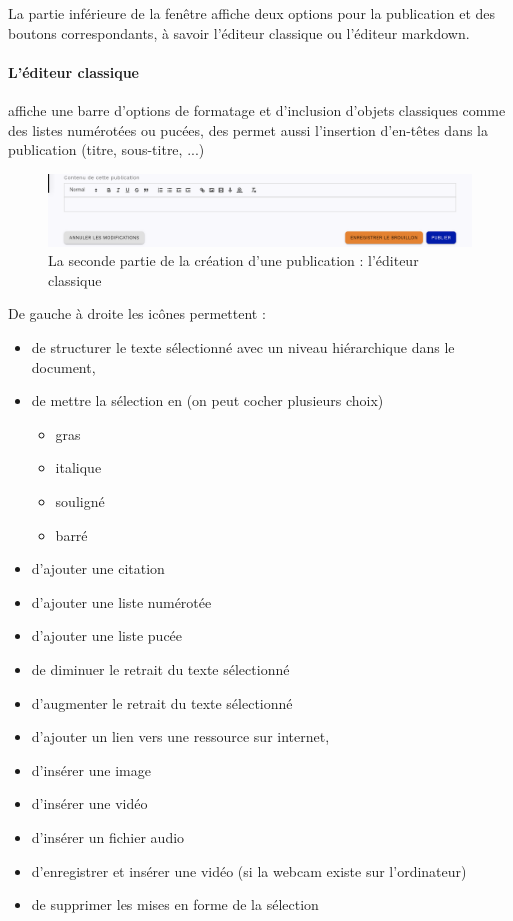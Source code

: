 La partie inférieure de la fenêtre affiche deux options pour la publication et des boutons correspondants, à savoir l'éditeur classique ou l'éditeur markdown.

\paragraph{L'éditeur classique} affiche une barre d'options de formatage et d'inclusion d'objets classiques comme des listes numérotées ou pucées, des  permet aussi l'insertion d'en-têtes dans la publication (titre, sous-titre,  ...)
\begin{figure}
	\centering
	\includegraphics{./Captures/portail.publications.creer.publication.2.classique.png}
	\caption{La seconde partie de la création d'une publication : l'éditeur classique}
\end{figure}
De gauche à droite les icônes permettent :
\begin{itemize}
	\item de structurer le texte sélectionné avec un niveau hiérarchique dans le document,
	\item de mettre la sélection en (on peut cocher plusieurs choix)
		\begin{itemize}
		\item gras
		\item italique
		\item souligné
		\item barré
		\end{itemize}
	\item d'ajouter une citation
	\item d'ajouter une liste numérotée
	\item d'ajouter une liste pucée
	\item de diminuer le retrait du texte sélectionné
	\item d'augmenter le retrait du texte sélectionné
	\item d'ajouter un lien vers une ressource sur internet,
	\item d'insérer une image
	\item d'insérer une vidéo
	\item d'insérer un fichier audio
	\item d'enregistrer et insérer une vidéo (si la webcam existe sur l'ordinateur)
	\item de supprimer les mises en forme de la sélection
\end{itemize}

